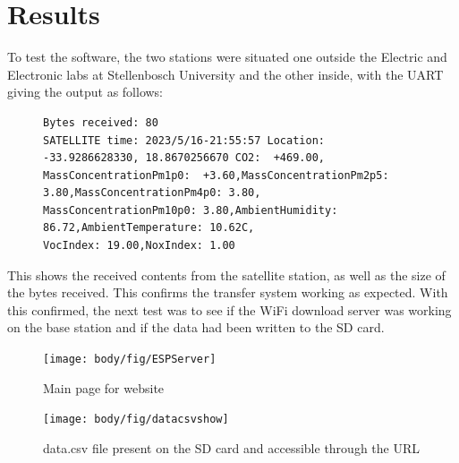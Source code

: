   
\chapter{Results}
To test the software, the two stations were situated one outside the Electric and Electronic labs at Stellenbosch University and the other inside, with the UART giving the output as follows:
\begin{figure}[!htb]
\begin{lstlisting}
Bytes received: 80
SATELLITE time: 2023/5/16-21:55:57 Location: -33.9286628330, 18.8670256670 CO2:  +469.00,
MassConcentrationPm1p0:  +3.60,MassConcentrationPm2p5: 3.80,MassConcentrationPm4p0: 3.80,
MassConcentrationPm10p0: 3.80,AmbientHumidity: 86.72,AmbientTemperature: 10.62C,
VocIndex: 19.00,NoxIndex: 1.00
\end{lstlisting}
\end{figure}

\noindent
This shows the received contents from the satellite station, as well as the size of the bytes received. This confirms the transfer system working as expected. With this confirmed, the next test was to see if the WiFi download server was working on the base station and if the data had been written to the SD card.

\begin{figure}[!htb]
	\texttt{[image: body/fig/ESPServer]}
	\caption{Main page for website}
	\label{fig:espserver}
	\endminipage\hfill
	\texttt{[image: body/fig/datacsvshow]}
	\caption{data.csv file present on the SD card and accessible through the URL}
	\label{fig:datacsvshow}
	\endminipage\hfill
\end{figure}

